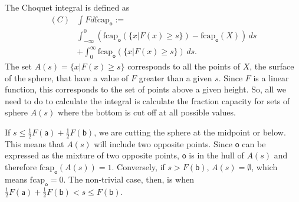\documentclass[10pt,twocolumn, nofootinbib]{revtex4-2}
\newcommand\frcap{\mathrm{fcap}}
\newcommand{\ens}[1][e] {\mathsf{#1}} %
\begin{document}
The Choquet integral is defined as 
\begin{equation}
	\begin{aligned}
(C)&\int F d\frcap_{\ens[o]} := \\
&\int_{-\infty}^0
(\frcap_{\ens[o]} (\{x | F (x) \geq s\})-\frcap_{\ens[o]}(X))\, ds \\
&+
\int^\infty_0
\frcap_{\ens[o]} (\{x | F (x) \geq s\})\, ds.
	\end{aligned}
\end{equation}
The set $A(s) = \{x | F (x) \geq s\}$ corresponds to all the points of $X$, the surface of the sphere, that have a value of $F$ greater than a given $s$. Since $F$ is a linear function, this corresponds to the set of points above a given height. So, all we need to do to calculate the integral is calculate the fraction capacity for sets of sphere $A(s)$ where the bottom is cut off at all possible values.

If $s\leq \frac{1}{2} F(\ens[a]) + \frac{1}{2} F(\ens[b])$, we are cutting the sphere at the midpoint or below. This means that $A(s)$ will include two opposite points. Since $\ens[o]$ can be expressed as the mixture of two opposite points, $\ens[o]$ is in the hull of $A(s)$ and therefore $\frcap_{\ens[o]}(A(s)) = 1$. Conversely, if $s > F(\ens[b])$, $A(s) = \emptyset$, which means $\frcap_{\ens[o]} = 0$. The non-trivial case, then, is when $\frac{1}{2} F(\ens[a]) + \frac{1}{2} F(\ens[b]) < s \leq F(\ens[b])$.
\end{document}
